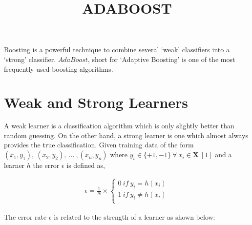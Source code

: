 \documentclass[11pt, a4paper]{article}
\begin{document}
\title{ADABOOST}
\date{}
\maketitle

Boosting is a powerful technique to combine several `weak' classifiers into a `strong' classifier. $AdaBoost$, short for `Adaptive Boosting' is one of the most frequently used boosting algorithms. 

\section{Weak and Strong Learners}

A weak learner is a classification algorithm which is only slightly better than random guessing. On the other hand, a strong learner is one which almost always provides the true classification.
Given training data of the form $(x_1, y_1),\ (x_2, y_2),\ ...\ , (x_n, y_n)$ where $y_i \in \{+1, -1\}\ \forall\ x_i \in \mathbf{X}\ [1]$  and a learner $h$ the error $\epsilon$ is defined as, 

\begin{align*}
	\epsilon = \frac{1}{N} \times \left\{ 
	\begin{array}{ll}                     
	0\ if\ y_i = h(x_i)                   \\
	1\ if\ y_i \neq h(x_i)                \\
	\end{array}                           
	\right.                               
\end{align*} 

The error rate $\epsilon$ is related to the strength of a learner as shown below:

\FloatBarrier
\begin{figure}[htbp]
	\centering
\end{figure}
\end{document}

